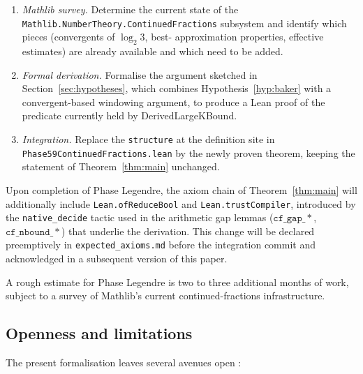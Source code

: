 \begin{enumerate}
  \item \emph{Mathlib survey.} Determine the current state of the
        \texttt{Mathlib.NumberTheory.ContinuedFractions} subsystem and
        identify which pieces (convergents of \(\log_2 3\), best-
        approximation properties, effective estimates) are already
        available and which need to be added.
  \item \emph{Formal derivation.} Formalise the argument sketched in
        Section~\ref{sec:hypotheses}, which combines Hypothesis~\ref{hyp:baker}
        with a convergent-based windowing argument, to produce a Lean
        proof of the predicate currently held by
        \textsf{DerivedLargeKBound}.
  \item \emph{Integration.} Replace the \texttt{structure} at the
        definition site in \texttt{Phase59ContinuedFractions.lean} by the
        newly proven theorem, keeping the statement of
        Theorem~\ref{thm:main} unchanged.
\end{enumerate}

Upon completion of Phase Legendre, the axiom chain of
Theorem~\ref{thm:main} will additionally include
\texttt{Lean.ofReduceBool} and \texttt{Lean.trustCompiler}, introduced by
the \texttt{native\_decide} tactic used in the arithmetic gap lemmas
(\(\mathtt{cf\_gap\_*}\), \(\mathtt{cf\_nbound\_*}\)) that underlie the
derivation. This change will be declared preemptively in
\texttt{expected\_axioms.md} before the integration commit and
acknowledged in a subsequent version of this paper.

A rough estimate for Phase Legendre is two to three additional months of
work, subject to a survey of Mathlib's current continued-fractions
infrastructure.

\subsection{Openness and limitations}

The present formalisation leaves several avenues open :

